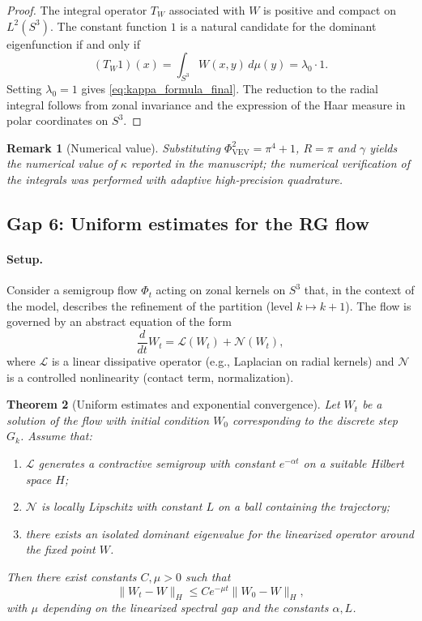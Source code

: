 \documentclass[12pt]{article}
\newtheorem{theorem}{Theorem}[section]
\newtheorem{remark}[theorem]{Remark}
\numberwithin{equation}{section}
\newcommand{\VEV}{\Phi_{\mathrm{VEV}}}
\begin{document}
\begin{proof}
The integral operator \(T_W\) associated with \(W\) is positive and compact on \(L^2(S^3)\). The constant function \(1\) is a natural candidate for the dominant eigenfunction if and only if
\[
(T_W 1)(x) = \int_{S^3} W(x,y)\,d\mu(y) = \lambda_0\cdot 1.
\]
Setting \(\lambda_0=1\) gives \eqref{eq:kappa_formula_final}. The reduction to the radial integral follows from zonal invariance and the expression of the Haar measure in polar coordinates on \(S^3\).
\end{proof}

\begin{remark}[Numerical value]
Substituting \(\VEV^2=\pi^4+1\), \(R=\pi\) and \(\gamma\) yields the numerical value of \(\kappa\) reported in the manuscript; the numerical verification of the integrals was performed with adaptive high-precision quadrature.
\end{remark}

\subsection{Gap 6: Uniform estimates for the RG flow}

\paragraph{Setup.} Consider a semigroup flow \(\Phi_t\) acting on zonal kernels on \(S^3\) that, in the context of the model, describes the refinement of the partition (level \(k\mapsto k+1\)). The flow is governed by an abstract equation of the form
\[
\frac{d}{dt} W_t = \mathcal{L}(W_t) + \mathcal{N}(W_t),
\]
where \(\mathcal{L}\) is a linear dissipative operator (e.g., Laplacian on radial kernels) and \(\mathcal{N}\) is a controlled nonlinearity (contact term, normalization).

\begin{theorem}[Uniform estimates and exponential convergence]
\label{thm:rg_uniform_final}
Let \(W_t\) be a solution of the flow with initial condition \(W_0\) corresponding to the discrete step \(G_k\). Assume that:
\begin{enumerate}
  \item \(\mathcal{L}\) generates a contractive semigroup with constant \(e^{-\alpha t}\) on a suitable Hilbert space \(H\);
  \item \(\mathcal{N}\) is locally Lipschitz with constant \(L\) on a ball containing the trajectory;
  \item there exists an isolated dominant eigenvalue for the linearized operator around the fixed point \(W\).
\end{enumerate}
Then there exist constants \(C,\mu>0\) such that
\[
\|W_t - W\|_H \le C e^{-\mu t}\|W_0-W\|_H,
\]
with \(\mu\) depending on the linearized spectral gap and the constants \(\alpha,L\).
\end{theorem}
\end{document}
